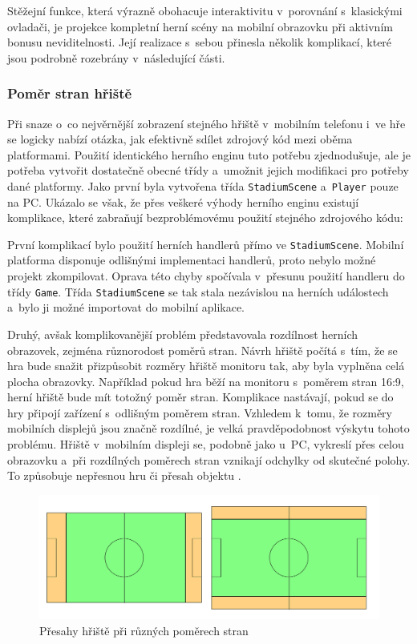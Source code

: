\documentclass[thesis=B,czech,hidelinks]{FITthesis}[2012/06/26] %
\newcommand{\code}[1]{\texttt{#1}}
\begin{document}
Stěžejní funkce, která výrazně obohacuje interaktivitu v~porovnání s~klasickými ovladači, je projekce kompletní herní scény na mobilní obrazovku při aktivním bonusu neviditelnosti. Její realizace s~sebou přinesla několik komplikací, které jsou podrobně rozebrány v~následující části. 

\subsubsection{Poměr stran hřiště}

Při snaze o~co nejvěrnější zobrazení stejného hřiště v~mobilním telefonu i~ve hře se logicky nabízí otázka, jak efektivně sdílet zdrojový kód mezi oběma platformami. Použití identického herního enginu tuto potřebu zjednodušuje, ale je potřeba vytvořit dostatečně obecné třídy a~umožnit jejich modifikaci pro potřeby dané platformy. Jako první byla vytvořena třída \code{StadiumScene} a~\code{Player} pouze na PC. Ukázalo se však, že přes veškeré výhody herního enginu existují komplikace, které zabraňují bezproblémovému použití stejného zdrojového kódu:

První komplikací bylo použití herních handlerů přímo ve \code{StadiumScene}. Mobilní platforma disponuje odlišnými implementaci handlerů, proto nebylo možné projekt zkompilovat. Oprava této chyby spočívala v~přesunu použití handleru do třídy \code{Game}. Třída \code{StadiumScene} se tak stala nezávislou na herních událostech a~bylo ji možné importovat do mobilní aplikace.

Druhý, avšak komplikovanější problém představovala rozdílnost herních obrazovek, zejména různorodost poměrů stran. Návrh hřiště počítá s~tím, že se hra bude snažit přizpůsobit rozměry hřiště monitoru tak, aby byla vyplněna celá plocha obrazovky. Například pokud hra běží na monitoru s~poměrem stran 16:9, herní hřiště bude mít totožný poměr stran. Komplikace nastávají, pokud se do hry připojí zařízení s~odlišným poměrem stran. Vzhledem k~tomu, že rozměry mobilních displejů jsou značně rozdílné, je velká pravděpodobnost výskytu tohoto problému. Hřiště v~mobilním displeji se, podobně jako u~PC, vykreslí přes celou obrazovku a~při rozdílných poměrech stran vznikají odchylky od skutečné polohy. To způsobuje nepřesnou hru či přesah objektu .

\begin{figure}
\center
\includegraphics[width=\textwidth]{stadium_proportions_2}
\caption{Přesahy hřiště při různých poměrech stran}
\label{picture:stadium_proportions}
\end{figure}
\end{document}
